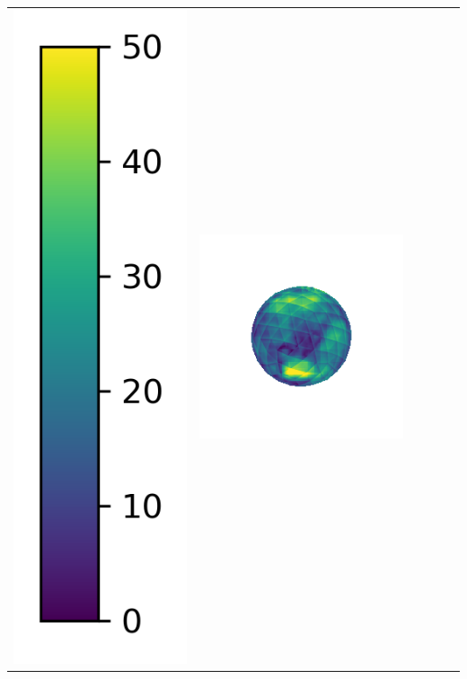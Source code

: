 \begin{center}
\begin{tabularx}{\linewidth}{@{}Y@{}Y@{}Y@{}Y@{}Y@{}Y@{}}
\includegraphics[width=0.2\linewidth]{semisynthetic/colorbar_error_vertical.png} &
\includegraphics[width=\linewidth]{semisynthetic/20160617_1_ours_err.png} &

\end{tabularx}
\end{center}
